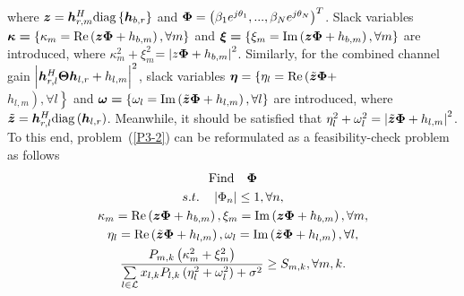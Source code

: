 \documentclass[journal]{IEEEtran}
\begin{document}
where $ \bm{z} = \bm{h}_{r,m}^H{\rm{diag}}\left\{ {{\bm{h}_{b,r}}} \right\} $ and $ {\bf{\Phi }} = {\left( {{\beta _1}{e^{j{\theta _1}}},...,{\beta _N}{e^{j{\theta _N}}}} \right)^T} $. Slack variables $ \bm{\kappa  = }\left\{ {{\kappa _m} = {\mathop{\rm Re}\nolimits} \left( {\bm{z}{\bf{\Phi }} + {h_{b,m}}} \right),\forall m} \right\} $ and $\bm{\xi  = }\left\{ {{\xi _m} = {\mathop{\rm Im}\nolimits} \left( {\bm{z}{\bf{\Phi }} + {h_{b,m}}} \right),\forall m} \right\}$ are introduced, where $ \kappa _m^2 + \xi _m^2$$={\left| {z{\bf{\Phi }} + {h_{b,m}}} \right|^2}$. Similarly, for the combined channel gain $ {\left| {\bm{h}_{r,l}^H{\bf{\Theta }}{\bm{h}_{l,r}} + {h_{l,m}}} \right|^2} $, slack variables $\bm{\eta } = \left\{ {{\eta _l} = } \right.{\mathop{\rm Re}\nolimits} \left( {\tilde{\bm{z}}{\bf{\Phi }} + } \right.$\\ $\left. {\left. {{h_{l,m}}} \right),\forall l} \right\}$ and $\bm{\omega  = }\left\{ {{\omega _l} = {\mathop{\rm Im}\nolimits} \left( {\tilde{\bm{z}}{\bf{\Phi }} + {h_{l,m}}} \right),\forall l} \right\}$ are introduced, where $ \tilde{\bm{z}} = \bm{h}_{r,l}^H{\rm{diag}}\left( {{\bm{h}_{l,r}}} \right) $. Meanwhile, it should be satisfied that $ \eta _l^2 + \omega _l^2 = {\left| {\tilde{\bm{z}}{\bf{\Phi }} + {h_{l,m}}} \right|^2} $. To this end, problem~(\ref{P3-2}) can be reformulated as a feasibility-check problem as follows
\begin{subequations}\label{P6}
	\begin{gather}
	{\rm{Find}}\quad{\bf{\Phi }}\\
	s.t.\quad \left| {{\Phi _n}} \right| \le 1,\forall n,\\
		{\kappa _m} = {\mathop{\rm Re}\nolimits} \left( {\bm{z}{\bf{\Phi }} + {h_{b,m}}} \right),{\xi _m} = {\mathop{\rm Im}\nolimits} \left( {\bm{z}{\bf{\Phi }} + {h_{b,m}}} \right),\forall m,\\
		{\eta _l} = {\mathop{\rm Re}\nolimits} \left( {\tilde{\bm{z}}{\bf{\Phi }} + {h_{l,m}}} \right),{\omega _l} = {\mathop{\rm Im}\nolimits} \left( {\tilde{\bm{z}}{\bf{\Phi }} + {h_{l,m}}} \right),\forall l,\\
	\frac{{{P_{m,k}}\left( {\kappa _m^2 + \xi _m^2} \right)}}{{\sum\limits_{l \in {\cal L}} {{x_{l,k}}{P_{l,k}}\left( {\eta _l^2 + \omega _l^2} \right)}  + {\sigma ^2}}} \ge {S_{m,k}},\forall m,k.
	\end{gather}
\end{subequations}
\end{document}
